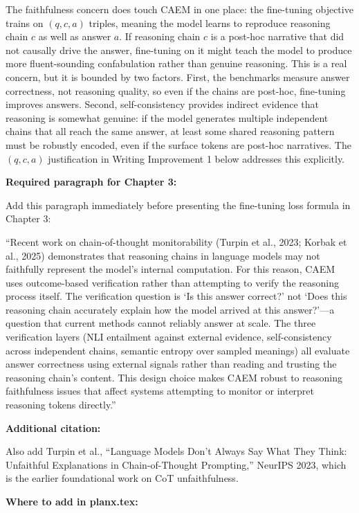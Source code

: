 \documentclass[11pt,a4paper]{article}
\begin{document}
{The faithfulness concern does touch CAEM in one place: the fine-tuning objective trains on $(q, c, a)$ triples, meaning the model learns to reproduce reasoning chain $c$ as well as answer $a$. If reasoning chain $c$ is a post-hoc narrative that did not causally drive the answer, fine-tuning on it might teach the model to produce more fluent-sounding confabulation rather than genuine reasoning. This is a real concern, but it is bounded by two factors. First, the benchmarks measure answer correctness, not reasoning quality, so even if the chains are post-hoc, fine-tuning improves answers. Second, self-consistency provides indirect evidence that reasoning is somewhat genuine: if the model generates multiple independent chains that all reach the same answer, at least some shared reasoning pattern must be robustly encoded, even if the surface tokens are post-hoc narratives. The $(q,c,a)$ justification in Writing Improvement 1 below addresses this explicitly.

\textbf{Required paragraph for Chapter 3:}

Add this paragraph immediately before presenting the fine-tuning loss formula in Chapter 3:

``Recent work on chain-of-thought monitorability (Turpin et al., 2023; Korbak et al., 2025) demonstrates that reasoning chains in language models may not faithfully represent the model's internal computation. For this reason, CAEM uses outcome-based verification rather than attempting to verify the reasoning process itself. The verification question is `Is this answer correct?' not `Does this reasoning chain accurately explain how the model arrived at this answer?'—a question that current methods cannot reliably answer at scale. The three verification layers (NLI entailment against external evidence, self-consistency across independent chains, semantic entropy over sampled meanings) all evaluate answer correctness using external signals rather than reading and trusting the reasoning chain's content. This design choice makes CAEM robust to reasoning faithfulness issues that affect systems attempting to monitor or interpret reasoning tokens directly.''

\textbf{Additional citation:}

Also add Turpin et al., ``Language Models Don't Always Say What They Think: Unfaithful Explanations in Chain-of-Thought Prompting,'' NeurIPS 2023, which is the earlier foundational work on CoT unfaithfulness.

\textbf{Where to add in planx.tex:}

}
\end{document}
